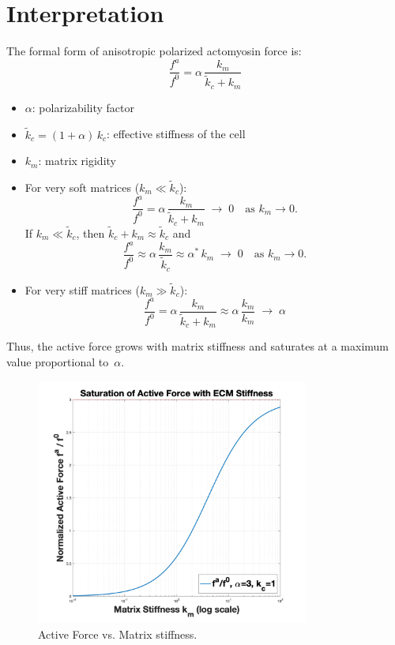 \documentclass{article}
\begin{document}
\section*{Interpretation}

The formal form of anisotropic polarized actomyosin force is:
\[
  \frac{f^{a}}{f^{0}}
  = \alpha \,\frac{k_{m}}{\tilde{k}_{c} + k_{m}}
\]

\begin{itemize}
  \item $\displaystyle \alpha$: polarizability factor
  \item $\displaystyle \tilde{k}_{c} = (1 + \alpha)\,k_{c}$: effective stiffness of the cell
  \item $k_{m}$: matrix rigidity
\end{itemize}

\begin{itemize}
  \item For very soft matrices (\(k_{m}\ll \tilde{k}_{c}\)):
    \[
      \frac{f^{a}}{f^{0}}
      = \alpha \,\frac{k_{m}}{\tilde{k}_{c} + k_{m}}
      \;\longrightarrow\;0
      \quad\text{as }k_{m}\to 0.
    \]
    If \(k_{m}\ll \tilde{k}_{c}\), then \(\tilde{k}_{c}+k_{m}\approx \tilde{k}_{c}\) and
    \[
      \frac{f^{a}}{f^{0}}
      \approx \alpha \,\frac{k_{m}}{\tilde{k}_{c}}
       \approx   \alpha^{*}  \,k_{m}
      \;\longrightarrow\;0
      \quad\text{as }k_{m}\to 0.
    \]
  \item For very stiff matrices (\(k_{m}\gg \tilde{k}_{c}\)):
    \[
      \frac{f^{a}}{f^{0}}
      = \alpha \,\frac{k_{m}}{\tilde{k}_{c} + k_{m}}
      \approx \alpha \,\frac{k_{m}}{k_{m}} 
      \;\longrightarrow\;\alpha
    \] 
\end{itemize}

Thus, the active force grows with matrix stiffness and  
saturates at a maximum value proportional to~$\alpha$.

\begin{figure}[H]
  \centering
  \includegraphics[width=0.8\textwidth]{plot}
  \caption{Active Force vs. Matrix stiffness.}
  \label{fig:activeForcet}
\end{figure}
     


\end{document}
